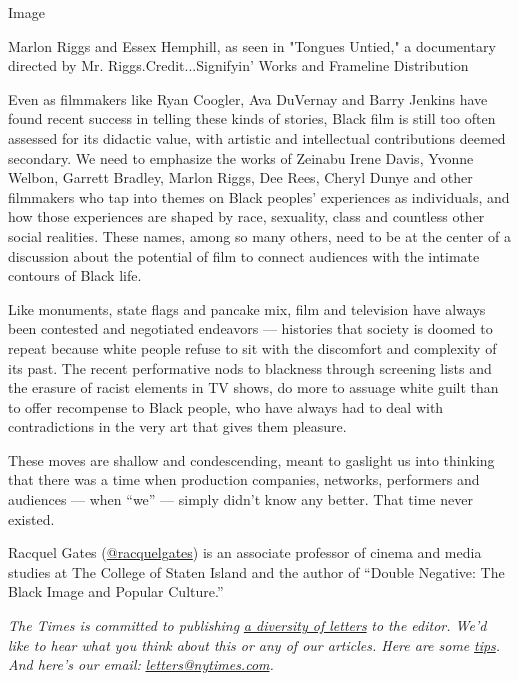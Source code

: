 Image

Marlon Riggs and Essex Hemphill, as seen in "Tongues Untied," a
documentary directed by Mr. Riggs.Credit...Signifyin' Works and
Frameline Distribution

Even as filmmakers like Ryan Coogler, Ava DuVernay and Barry Jenkins
have found recent success in telling these kinds of stories, Black film
is still too often assessed for its didactic value, with artistic and
intellectual contributions deemed secondary. We need to emphasize the
works of Zeinabu Irene Davis, Yvonne Welbon, Garrett Bradley, Marlon
Riggs, Dee Rees, Cheryl Dunye and other filmmakers who tap into themes
on Black peoples' experiences as individuals, and how those experiences
are shaped by race, sexuality, class and countless other social
realities. These names, among so many others, need to be at the center
of a discussion about the potential of film to connect audiences with
the intimate contours of Black life.

Like monuments, state flags and pancake mix, film and television have
always been contested and negotiated endeavors --- histories that
society is doomed to repeat because white people refuse to sit with the
discomfort and complexity of its past. The recent performative nods to
blackness through screening lists and the erasure of racist elements in
TV shows, do more to assuage white guilt than to offer recompense to
Black people, who have always had to deal with contradictions in the
very art that gives them pleasure.

These moves are shallow and condescending, meant to gaslight us into
thinking that there was a time when production companies, networks,
performers and audiences --- when ``we'' --- simply didn't know any
better. That time never existed.

Racquel Gates (\href{https://twitter.com/racquelgates}{@racquelgates})
is an associate professor of cinema and media studies at The College of
Staten Island and the author of ``Double Negative: The Black Image and
Popular Culture.''

\emph{The Times is committed to publishing}
\href{https://www.nytimes.com/2019/01/31/opinion/letters/letters-to-editor-new-york-times-women.html}{\emph{a
diversity of letters}} \emph{to the editor. We'd like to hear what you
think about this or any of our articles. Here are some}
\href{https://help.nytimes.com/hc/en-us/articles/115014925288-How-to-submit-a-letter-to-the-editor}{\emph{tips}}\emph{.
And here's our email:}
\href{mailto:letters@nytimes.com}{\emph{letters@nytimes.com}}\emph{.}

